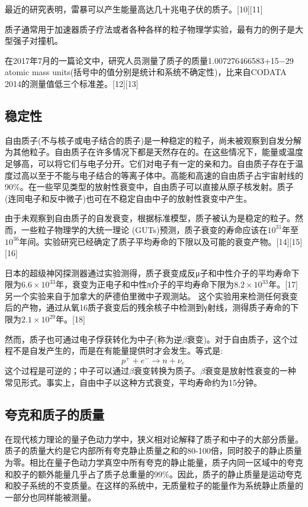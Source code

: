 最近的研究表明，雷暴可以产生能量高达几十兆电子伏的质子。[10][11]

质子通常用于加速器质子疗法或者各种各样的粒子物理学实验，最有力的例子是大型强子对撞机。

在2017年7月的一篇论文中，研究人员测量了质子的质量1.007276466583+15−29 atomic mass units(括号中的值分别是统计和系统不确定性)，比来自CODATA 2014的测量值低三个标准差。[12][13]

\subsection{稳定性}
自由质子(不与核子或电子结合的质子)是一种稳定的粒子，尚未被观察到自发分解为其他粒子。自由质子在许多情况下都是天然存在的。在这些情况下，能量或温度足够高，可以将它们与电子分开。它们对电子有一定的亲和力。自由质子存在于温度过高以至于不能与电子结合的等离子体中。高能和高速的自由质子占宇宙射线的90\%。在一些罕见类型的放射性衰变中，自由质子可以直接从原子核发射。质子(连同电子和反中微子)也可在不稳定自由中子的放射性衰变中产生。

由于未观察到自由质子的自发衰变，根据标准模型，质子被认为是稳定的粒子。然而，一些粒子物理学的大统一理论 (GUTs)预测，质子衰变的寿命应该在$10^{31}$年至$10^{36}$年间。实验研究已经确定了质子平均寿命的下限以及可能的衰变产物。[14][15][16]

日本的超级神冈探测器通过实验测得，质子衰变成反μ子和中性介子的平均寿命下限为$6.6\times10^{33}$年，衰变为正电子和中性π介子的平均寿命下限为$8.2\times10^{33}$年。[17]另一个实验来自于加拿大的萨德伯里微中子观测站。 这个实验用来检测任何衰变后的产物，通过从氧16质子衰变后的残余核子中检测到γ射线，测得质子寿命的下限为$2.1\times10^{29}$年。[18]

然而，质子也可通过电子俘获转化为中子(称为逆$\beta$衰变)。对于自由质子，这个过程不是自发产生的，而是在有能量提供时才会发生。等式是:
$$p^+ + e^- \to n +\nu_e~$$
这个过程是可逆的；中子可以通过$\beta$衰变转换为质子。$\beta$衰变是放射性衰变的一种常见形式。事实上，自由中子以这种方式衰变，平均寿命约为15分钟。

\subsection{夸克和质子的质量}
在现代核力理论的量子色动力学中，狭义相对论解释了质子和中子的大部分质量。质子的质量大约是它内部所有夸克静止质量之和的80-100倍，同时胶子的静止质量为零。相比在量子色动力学真空中所有夸克的静止能量，质子内同一区域中的夸克和胶子的额外能量几乎占了质子总重量的99\%。因此，质子的静止质量是运动夸克和胶子系统的不变质量。在这样的系统中，无质量粒子的能量作为系统静止质量的一部分也同样能被测量。

